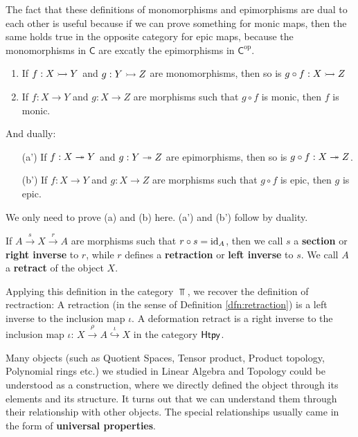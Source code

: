 The fact that these definitions of monomorphisms and epimorphisms are dual to each other is useful because if we can prove something for monic maps, then the same holds true in the opposite category for epic maps, because the monomorphisms in $\textsf{C}$ are excatly the epimorphisms in $\textsf{C}^{\text{op}}$.

\begin{lem}[]
  \phantom{a}
  \begin{enumerate}
    \item If $f: X \rightarrowtail Y$ and $g: Y \rightarrowtail Z$ are monomorphisms, then so is $g \circ f: X \rightarrowtail Z$
    \item If $f: X \to Y$ and $g: X \to Z$ are morphisms such that $g \circ f$ is monic, then $f$ is monic.
  \end{enumerate}
  And dually:
  \begin{enumerate}
    \item[(a')] If $f: X \twoheadrightarrow Y$ and $g: Y \twoheadrightarrow Z$ are epimorphisms, then so is $g \circ f: X \twoheadrightarrow Z$.
    \item[(b')] If $f: X \to Y$ and $g: X \to Z$ are morphisms such that $g \circ f$ is epic, then $g$ is epic.
  \end{enumerate}
\end{lem}
We only need to prove (a) and (b) here. (a') and (b') follow by duality.

\begin{dfn}[]
If $A \stackrel{s}{\to} X \stackrel{r}{\to} A$ are morphisms such that $r \circ s = \operatorname{id}_A$, then we call $s$ a \textbf{section} or \textbf{right inverse} to $r$, while $r$ defines a \textbf{retraction} or \textbf{left inverse} to $s$.
We call $A$ a \textbf{retract} of the object $X$.
\end{dfn}
Applying this definition in the category $\Top$, we recover the definition of rectraction: 
A retraction (in the sense of Definition \ref{dfn:retraction}) is a left inverse to the inclusion map $\iota$.
A deformation retract is a right inverse to the inclusion map $\iota$: $X \stackrel{\rho}{\to} A \stackrel{\iota}{\hookrightarrow} X$ in the category $\text{\sffamily Htpy}$.

Many objects (such as Quotient Spaces, Tensor product, Product topology, Polynomial rings etc.) we studied in Linear Algebra and Topology could be understood as a construction, where we directly defined the object through its elements and its structure.
It turns out that we can understand them through their relationship with other objects.
The special relationships usually came in the form of \textbf{universal properties}. 

